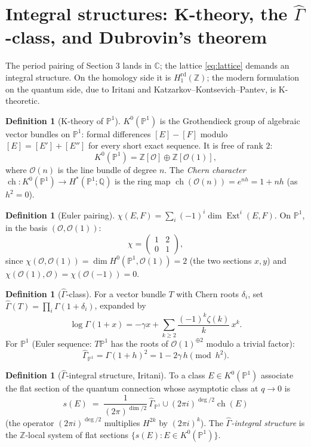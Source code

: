 \documentclass[11pt]{article}
\theoremstyle{definition}
\newtheorem{definition}[proposition]{Definition}
\theoremstyle{remark}
\newcommand{\C}{\mathbb{C}}
\newcommand{\Z}{\mathbb{Z}}
\newcommand{\Q}{\mathbb{Q}}
\newcommand{\PP}{\mathbb{P}}
\newcommand{\rd}{\mathrm{rd}}
\newcommand{\ch}{\operatorname{ch}}
\newcommand{\G}{\Gamma}
\begin{document}
\section{Integral structures: K-theory, the $\widehat\G$-class,
and Dubrovin's theorem}

The period pairing of Section 3 lands in $\C$; the lattice
\eqref{eq:lattice} demands an integral structure. On the homology
side it is $H_1^{\rd}(\Z)$; the modern formulation on the quantum
side, due to Iritani and Katzarkov--Kontsevich--Pantev, is
K-theoretic.

\begin{definition}[K-theory of $\PP^1$]
$K^0(\PP^1)$ is the Grothendieck group of algebraic vector bundles
on $\PP^1$: formal differences $[E] - [F]$ modulo
$[E] = [E'] + [E'']$ for every short exact sequence. It is free of
rank $2$:
\[
  K^0(\PP^1) = \Z[\mathcal O] \oplus \Z[\mathcal O(1)],
\]
where $\mathcal O(n)$ is the line bundle of degree $n$. The
\emph{Chern character} $\ch \colon K^0(\PP^1) \to H^\ast(\PP^1;
\Q)$ is the ring map $\ch(\mathcal O(n)) = e^{nh} = 1 + nh$ (as
$h^2 = 0$).
\end{definition}

\begin{definition}[Euler pairing]
$\chi(E, F) = \sum_i (-1)^i \dim \operatorname{Ext}^i(E, F)$. On
$\PP^1$, in the basis $(\mathcal O, \mathcal O(1))$:
\[
  \chi = \begin{pmatrix} 1 & 2 \\ 0 & 1 \end{pmatrix},
\]
since $\chi(\mathcal O, \mathcal O(1)) = \dim H^0(\PP^1,
\mathcal O(1)) = 2$ (the two sections $x, y$) and
$\chi(\mathcal O(1), \mathcal O) = \chi(\mathcal O(-1)) = 0$.
\end{definition}

\begin{definition}[$\widehat\G$-class]
For a vector bundle $T$ with Chern roots $\delta_i$, set
$\widehat\G(T) = \prod_i \G(1 + \delta_i)$, expanded by
\[
  \log\G(1+x) = -\gamma x + \sum_{k\ge2}
  \frac{(-1)^k\zeta(k)}{k}\,x^k .
\]
For $\PP^1$ (Euler sequence: $T\PP^1$ has the roots of
$\mathcal O(1)^{\oplus2}$ modulo a trivial factor):
\[
  \widehat\G_{\PP^1} = \G(1+h)^2 = 1 - 2\gamma\,h
  \pmod{h^2}.
\]
\end{definition}

\begin{definition}[$\widehat\G$-integral structure, Iritani]
To a class $E \in K^0(\PP^1)$ associate the flat section of the
quantum connection whose asymptotic class at $q \to 0$ is
\[
  s(E) \;=\; \frac{1}{(2\pi)^{\dim/2}}\,
  \widehat\G_{\PP^1} \cup
  (2\pi i)^{\deg/2}\ch(E)
\]
(the operator $(2\pi i)^{\deg/2}$ multiplies $H^{2k}$ by
$(2\pi i)^k$). The \emph{$\widehat\G$-integral structure} is the
$\Z$-local system of flat sections $\{s(E) : E \in K^0(\PP^1)\}$.
\end{definition}
\end{document}
